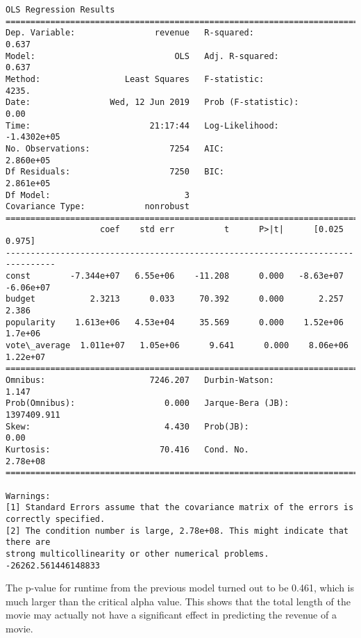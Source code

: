 \documentclass[11pt]{article}
\begin{document}
    \begin{Verbatim}[commandchars=\\\{\}]
                            OLS Regression Results                            
==============================================================================
Dep. Variable:                revenue   R-squared:                       0.637
Model:                            OLS   Adj. R-squared:                  0.637
Method:                 Least Squares   F-statistic:                     4235.
Date:                Wed, 12 Jun 2019   Prob (F-statistic):               0.00
Time:                        21:17:44   Log-Likelihood:            -1.4302e+05
No. Observations:                7254   AIC:                         2.860e+05
Df Residuals:                    7250   BIC:                         2.861e+05
Df Model:                           3                                         
Covariance Type:            nonrobust                                         
================================================================================
                   coef    std err          t      P>|t|      [0.025      0.975]
--------------------------------------------------------------------------------
const        -7.344e+07   6.55e+06    -11.208      0.000   -8.63e+07   -6.06e+07
budget           2.3213      0.033     70.392      0.000       2.257       2.386
popularity    1.613e+06   4.53e+04     35.569      0.000    1.52e+06     1.7e+06
vote\_average  1.011e+07   1.05e+06      9.641      0.000    8.06e+06    1.22e+07
==============================================================================
Omnibus:                     7246.207   Durbin-Watson:                   1.147
Prob(Omnibus):                  0.000   Jarque-Bera (JB):          1397409.911
Skew:                           4.430   Prob(JB):                         0.00
Kurtosis:                      70.416   Cond. No.                     2.78e+08
==============================================================================

Warnings:
[1] Standard Errors assume that the covariance matrix of the errors is correctly specified.
[2] The condition number is large, 2.78e+08. This might indicate that there are
strong multicollinearity or other numerical problems.
-26262.561446148833

    \end{Verbatim}

    The p-value for runtime from the previous model turned out to be 0.461,
which is much larger than the critical alpha value. This shows that the
total length of the movie may actually not have a significant effect in
predicting the revenue of a movie.
\end{document}
